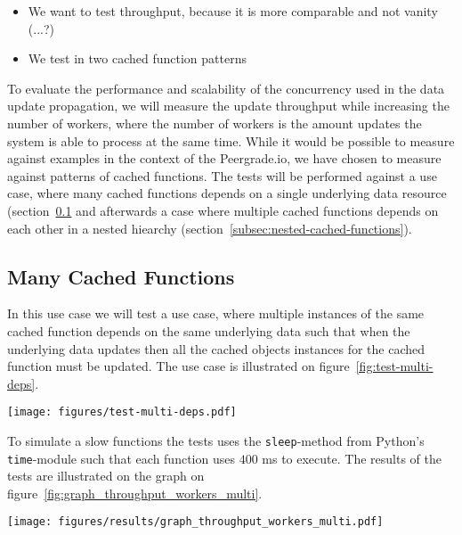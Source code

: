 \begin{itemize}
  \item We want to test throughput, because it is more comparable and not vanity (...?)
  \item We test in two cached function patterns
\end{itemize}

To evaluate the performance and scalability of the concurrency used in the data update propagation, we will measure the update throughput while increasing the number of workers, where the number of workers is the amount updates the system is able to process at the same time. While it would be possible to measure against examples in the context of the Peergrade.io, we have chosen to measure against patterns of cached functions. The tests will be performed against a use case, where many cached functions depends on a single underlying data resource (section~\ref{subsec:many-cached-functions} and afterwards a case where multiple cached functions depends on each other in a nested hiearchy (section~\ref{subsec:nested-cached-functions}).

\subsection{Many Cached Functions}
\label{subsec:many-cached-functions}

In this use case we will test a use case, where multiple instances of the same cached function depends on the same underlying data such that when the underlying data updates then all the cached objects instances for the cached function must be updated. The use case is illustrated on figure~\ref{fig:test-multi-deps}.

\begin{figure*}[ht!]
  \centering
  \texttt{[image: figures/test-multi-deps.pdf]}
  \caption{Illustration of the dependencies of the cached function for the "Many Cached Functions" test case}
  \label{fig:test-multi-deps}
\end{figure*}

To simulate a slow functions the tests uses the \verb$sleep$-method from Python's \verb$time$-module such that each function uses $400$ ms to execute. The results of the tests are illustrated on the graph on figure~\ref{fig:graph_throughput_workers_multi}.

\begin{figure*}[ht!]
  \centering
  \texttt{[image: figures/results/graph\_throughput\_workers\_multi.pdf]}
  \caption{How the system scales with many cached functions depending on the same underlying data while the number of workers is increased}
  \label{fig:graph_throughput_workers_multi}
\end{figure*}

